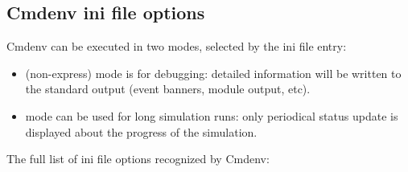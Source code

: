 \subsection{Cmdenv ini file options}
\label{sec:ch-run-sim:cmdenv-section}

Cmdenv can be executed in two modes, selected by the  ini file entry:

\begin{itemize}
    \item {} (non-express) mode is for debugging: detailed information
        will be written to the standard output (event banners, module output,
        etc).
    \item {} mode can be used for long simulation runs: only
        periodical status update is displayed about the progress of the
        simulation.
\end{itemize}

The full list of ini file options recognized by Cmdenv:

